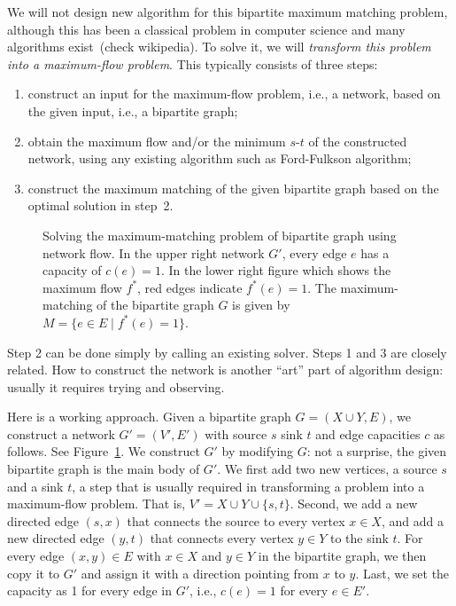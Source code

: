 We will not design new algorithm for this bipartite maximum matching problem, although this has
been a classical problem in computer science and many algorithms exist~(check wikipedia).
To solve it, we will \emph{transform this problem into a maximum-flow problem}.
This typically consists of three steps:
\begin{enumerate}
\item construct an input for the maximum-flow problem, i.e., a network, based
on the given input, i.e., a bipartite graph;
\item obtain the maximum flow and/or the minimum $s$-$t$ of the constructed
network, using any existing algorithm such as Ford-Fulkson algorithm;
\item construct the maximum matching of the given bipartite graph based on the
optimal solution in step~2.
\end{enumerate}

\begin{figure}[!h]
\centering{}
\caption{Solving the maximum-matching problem of bipartite graph using network flow.
In the upper right network $G'$, every edge $e$ has a capacity of $c(e) = 1$.
In the lower right figure which shows the maximum flow $f^*$, red edges indicate $f^*(e)=1$. 
The maximum-matching of the bipartite graph $G$ is given by $M = \{e\in E\mid f^*(e) = 1\}$.}
\label{fig:transform}
\end{figure}


Step 2 can be done simply by calling an existing solver. Steps 1 and 3 are closely related.
How to construct the network is another ``art'' part of algorithm design: usually it requires
trying and observing.

Here is a working approach. Given a bipartite graph $G = (X\cup Y, E)$, we construct
a network $G' = (V', E')$ with source $s$ sink $t$ and edge capacities $c$ as follows.
See Figure~\ref{fig:transform}.
We construct $G'$ by modifying $G$: not a surprise, the given bipartite graph is the main
body of $G'$.
We first add two new vertices, a source $s$ and a sink $t$, a step that is usually required
in transforming a problem into a maximum-flow problem.
That is, $V' = X\cup Y\cup \{s, t\}$.
Second, we add a new directed edge $(s,x)$ that connects the source to every vertex $x\in X$, 
and add a new directed edge $(y,t)$ that connects every vertex $y\in Y$ to the sink $t$. 
For every edge $(x,y)\in E$ with $x\in X$ and $y\in Y$ in the bipartite graph,
we then copy it to $G'$ and assign it with a direction pointing from $x$ to $y$.
Last, we set the capacity as 1 for every edge in $G'$, i.e., $c(e) = 1$ for every $e\in E'$.


